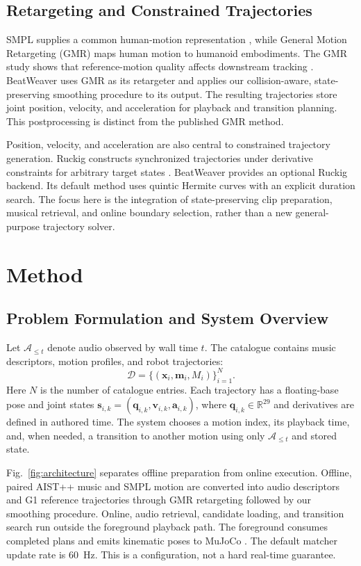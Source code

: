 \documentclass[conference]{IEEEtran}
\newcommand{\vect}[1]{\boldsymbol{#1}}
\newcommand{\R}{\mathbb{R}}
\begin{document}
\subsection{Retargeting and Constrained Trajectories}
SMPL supplies a common human-motion representation \cite{loper2023smpl}, while
General Motion Retargeting (GMR) maps human motion to humanoid embodiments.
The GMR study shows that reference-motion quality affects downstream tracking
\cite{araujo2025retargeting}. BeatWeaver uses GMR as its retargeter and applies
our collision-aware, state-preserving smoothing procedure to its output.
The resulting trajectories store joint position, velocity, and acceleration
for playback and transition planning. This postprocessing is distinct from
the published GMR method.

Position, velocity, and acceleration are also central to constrained trajectory
generation. Ruckig constructs synchronized trajectories under derivative
constraints for arbitrary target states \cite{berscheid2021ruckig}.
BeatWeaver provides an optional Ruckig backend. Its default method uses quintic
Hermite curves with an explicit duration search. The focus here is the
integration of state-preserving clip preparation, musical retrieval, and
online boundary selection, rather than a new general-purpose trajectory solver.

\section{Method}
\subsection{Problem Formulation and System Overview}
Let $\mathcal{A}_{\leq t}$ denote audio observed by wall time $t$. The
catalogue contains music descriptors, motion profiles, and robot trajectories:
\begin{equation}
\mathcal{D}=\{(\vect{x}_i,\vect{m}_i,M_i)\}_{i=1}^{N}.
\end{equation}
Here $N$ is the number of catalogue entries. Each trajectory has a floating-base pose and joint states
$\vect{s}_{i,k}=(\vect{q}_{i,k},\vect{v}_{i,k},\vect{a}_{i,k})$, where
$\vect{q}_{i,k}\in\R^{29}$ and derivatives are defined in authored time.
The system chooses a motion index, its playback time, and, when needed, a
transition to another motion using only $\mathcal{A}_{\leq t}$ and stored state.

Fig.~\ref{fig:architecture} separates offline preparation from online
execution. Offline, paired AIST++ music and SMPL motion are converted into
audio descriptors and G1 reference trajectories through GMR retargeting
followed by our smoothing procedure. Online, audio retrieval,
candidate loading, and transition search run outside the foreground playback
path. The foreground consumes completed plans and emits kinematic poses to
MuJoCo \cite{todorov2012mujoco}. The default matcher update rate is 60~Hz.
This is a configuration, not a hard real-time guarantee.
\end{document}
